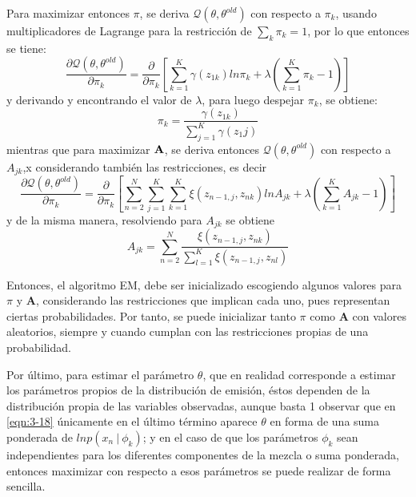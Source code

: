 Para maximizar entonces $\pi$, se deriva $\mathcal{Q}(\theta, \theta^{old})$ con respecto a $\pi_k$, usando multiplicadores de Lagrange para la restricción de $\sum_k \pi_k = 1$, por lo que entonces se tiene: 
\begin{equation*}
  \frac {\partial \mathcal{Q}(\theta, \theta^{old})}{\partial \pi_k} = 
  \frac {\partial}{\partial \pi_k} 
  \left[
    \sum_{k=1}^K \gamma(z_{1k}) ln \pi_k + \lambda (\sum_{k=1}^K \pi_k - 1) 
  \right]
\end{equation*}
y derivando y encontrando el valor de $\lambda$, para luego despejar $\pi_k$, se obtiene:
\begin{equation}
  \pi_k = \frac{\gamma(z_{1k})}{\sum_{j=1}^K \gamma(z_1j)}
\label{eqn:3-19}
\end{equation}
mientras que para maximizar $\textbf{A}$, se deriva entonces $\mathcal{Q}(\theta, \theta^{old})$ con respecto a $A_{jk}$,x considerando también las restricciones, es decir
\begin{equation*}
  \frac {\partial \mathcal{Q}(\theta, \theta^{old})}{\partial \pi_k} = 
  \frac {\partial}{\partial \pi_k} 
  \left[
    \sum_{n=2}^N \sum_{j=1}^K \sum_{k=1}^K \xi(z_{n-1,j}, z_{nk}) ln A_{jk} 
    + \lambda (\sum_{k=1}^K A_{jk} - 1) 
  \right]
\end{equation*}
y de la misma manera, resolviendo para $A_{jk}$ se obtiene
\begin{equation}
A_{jk} = \sum_{n=2}^N 
  \frac{\xi(z_{n-1,j}, z_{nk})}
  {\sum_{l=1}^K \xi(z_{n-1,j}, z_{nl})}
\label{eqn:3-20}
\end{equation}

Entonces, el algoritmo EM, debe ser inicializado escogiendo algunos valores para $\pi$ y $\mathbf{A}$, considerando las restricciones que implican cada uno, pues representan ciertas probabilidades. Por tanto, se puede inicializar tanto $\pi$ como $\mathbf{A}$ con valores aleatorios, siempre y cuando cumplan con las restricciones propias de una probabilidad. 

Por último, para estimar el parámetro $\theta$, que en realidad corresponde a estimar los parámetros propios de la distribución de emisión, éstos dependen de la distribución propia de las variables observadas, aunque basta 1 observar que en \eqref{eqn:3-18} únicamente en el último término aparece $\theta$ en forma de una suma ponderada de $ln p(x_n ~|~  \phi_k)$; y en el caso de que los parámetros $\phi_k$ sean independientes para los diferentes componentes de la mezcla o suma ponderada, entonces maximizar con respecto a esos parámetros se puede realizar de forma sencilla.

